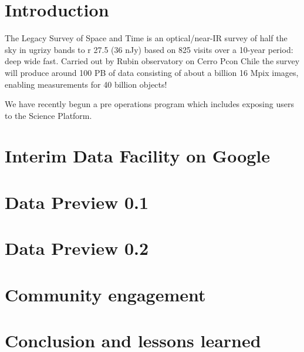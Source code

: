 \section{Introduction}

The Legacy Survey of Space and Time is an optical/near-IR survey of half the sky in ugrizy bands to r 27.5 (36 nJy) based on 825 visits over a 10-year period: deep wide fast.
Carried out by Rubin observatory on Cerro Pcon Chile the survey will produce around 100 PB of data consisting of about a billion 16 Mpix images, enabling measurements for 40 billion objects! \cite{arXiv:0805.2366}

We have recently begun a pre operations program which includes exposing users to the Science Platform.


\section{Interim Data Facility on Google }



\section{Data Preview 0.1}


\section{Data Preview 0.2}

\section{Community engagement }

\section{Conclusion and lessons learned}



